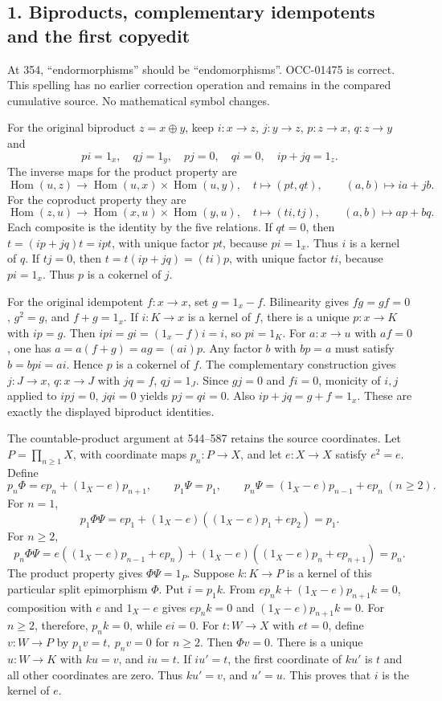 \documentclass[11pt]{article}
\begin{document}
\subsection{1. Biproducts, complementary idempotents and the first copyedit}\label{note-01-biproducts-complementary-idempotents-and-the-first-copyedit}

At 354, ``endormorphisms'' should be ``endomorphisms''. OCC-01475 is correct. This spelling has no earlier correction operation and remains in the compared cumulative source. No mathematical symbol changes.

For the original biproduct \(z=x\oplus y\), keep \(i:x\to z\), \(j:y\to z\), \(p:z\to x\), \(q:z\to y\) and \[
pi=1_x,\quad qj=1_y,\quad pj=0,\quad qi=0,\quad ip+jq=1_z.
\] The inverse maps for the product property are \[
\operatorname{Hom}(u,z)\longrightarrow
\operatorname{Hom}(u,x)\times\operatorname{Hom}(u,y),\quad
t\longmapsto(pt,qt),\qquad (a,b)\longmapsto ia+jb.
\] For the coproduct property they are \[
\operatorname{Hom}(z,u)\longrightarrow
\operatorname{Hom}(x,u)\times\operatorname{Hom}(y,u),\quad
t\longmapsto(ti,tj),\qquad (a,b)\longmapsto ap+bq.
\] Each composite is the identity by the five relations. If \(qt=0\), then \(t=(ip+jq)t=ipt\), with unique factor \(pt\), because \(pi=1_x\). Thus \(i\) is a kernel of \(q\). If \(tj=0\), then \(t=t(ip+jq)=(ti)p\), with unique factor \(ti\), because \(pi=1_x\). Thus \(p\) is a cokernel of \(j\).

For the original idempotent \(f:x\to x\), set \(g=1_x-f\). Bilinearity gives \(fg=gf=0\), \(g^2=g\), and \(f+g=1_x\). If \(i:K\to x\) is a kernel of \(f\), there is a unique \(p:x\to K\) with \(ip=g\). Then \(ipi=gi=(1_x-f)i=i\), so \(pi=1_K\). For \(a:x\to u\) with \(af=0\), one has \(a=a(f+g)=ag=(ai)p\). Any factor \(b\) with \(bp=a\) must satisfy \(b=bpi=ai\). Hence \(p\) is a cokernel of \(f\). The complementary construction gives \(j:J\to x\), \(q:x\to J\) with \(jq=f\), \(qj=1_J\). Since \(gj=0\) and \(fi=0\), monicity of \(i,j\) applied to \(ipj=0\), \(jqi=0\) yields \(pj=qi=0\). Also \(ip+jq=g+f=1_x\). These are exactly the displayed biproduct identities.

The countable-product argument at 544--587 retains the source coordinates. Let \(P=\prod_{n\geq1}X\), with coordinate maps \(p_n:P\to X\), and let \(e:X\to X\) satisfy \(e^2=e\). Define \[
p_n\Phi=e p_n+(1_X-e)p_{n+1},\qquad
p_1\Psi=p_1,\qquad
p_n\Psi=(1_X-e)p_{n-1}+e p_n\ (n\geq2).
\] For \(n=1\), \[
p_1\Phi\Psi=e p_1+(1_X-e)((1_X-e)p_1+e p_2)=p_1.
\] For \(n\geq2\), \[
p_n\Phi\Psi
=e((1_X-e)p_{n-1}+e p_n)
 +(1_X-e)((1_X-e)p_n+e p_{n+1})=p_n.
\] The product property gives \(\Phi\Psi=1_P\). Suppose \(k:K\to P\) is a kernel of this particular split epimorphism \(\Phi\). Put \(i=p_1k\). From \(e p_nk+(1_X-e)p_{n+1}k=0\), composition with \(e\) and \(1_X-e\) gives \(e p_nk=0\) and \((1_X-e)p_{n+1}k=0\). For \(n\geq2\), therefore, \(p_nk=0\), while \(ei=0\). For \(t:W\to X\) with \(et=0\), define \(v:W\to P\) by \(p_1v=t,\ p_nv=0\) for \(n\geq2\). Then \(\Phi v=0\). There is a unique \(u:W\to K\) with \(ku=v\), and \(iu=t\). If \(iu'=t\), the first coordinate of \(ku'\) is \(t\) and all other coordinates are zero. Thus \(ku'=v\), and \(u'=u\). This proves that \(i\) is the kernel of \(e\).
\end{document}
